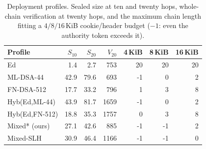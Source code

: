 \begin{table}[t]
\centering\small
\caption{Deployment profiles. Sealed size at ten and twenty hops, whole-chain verification at twenty hops, and the maximum chain length fitting a $4/8/16$\,KiB cookie/header budget ($-1$: even the authority token exceeds it).}
\label{tab:depprof}
\begin{tabular}{lrrrrrr}
\hline
Profile & $S_{10}$ & $S_{20}$ & $V_{20}$ & 4\,KiB & 8\,KiB & 16\,KiB\\
\hline
Ed & 1.4 & 2.7 & 753 & 20 & 20 & 20 \\
ML-DSA-44 & 42.9 & 79.6 & 693 & -1 & 0 & 2 \\
FN-DSA-512 & 17.7 & 33.2 & 796 & 1 & 3 & 8 \\
Hyb(Ed,ML-44) & 43.9 & 81.7 & 1659 & -1 & 0 & 2 \\
Hyb(Ed,FN-512) & 18.8 & 35.3 & 1757 & 0 & 3 & 8 \\
Mixed* (ours) & 27.1 & 42.6 & 885 & -1 & -1 & 2 \\
Mixed-SLH & 30.9 & 46.4 & 1166 & -1 & -1 & 0 \\
\hline
\end{tabular}
\end{table}